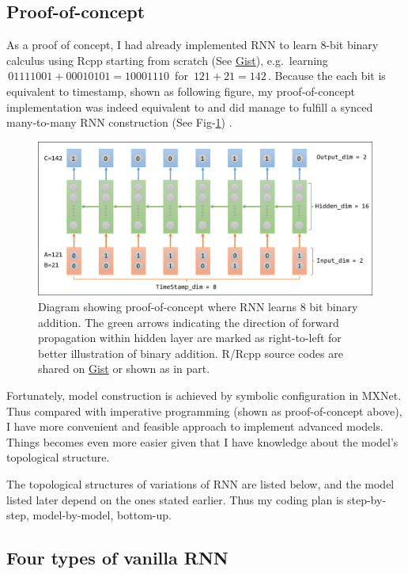 \documentclass[]{article}
\begin{document}
\subsection{Proof-of-concept}\label{proof-of-concept}

As a proof of concept, I had already implemented RNN to learn 8-bit
binary calculus using Rcpp starting from scratch (See
\href{https://gist.github.com/Puriney/072a37ea8a181f0b6168}{Gist}),
e.g.~learning \(\,01111001 + 00010101 = 10001110\,\) for
\(\,121+21=142\,\). Because the each bit is equivalent to timestamp,
shown as following figure, my proof-of-concept implementation was indeed
equivalent to and did manage to fulfill a synced many-to-many RNN
construction (See Fig-\ref{fig:proof-of-concept}) .

\begin{figure}[ht]
\centering
\includegraphics[width=0.8\linewidth]{binary-addition.png}
\caption{Diagram showing proof-of-concept where RNN learns 8 bit binary addition. The green arrows indicating the direction of forward propagation within hidden layer are marked as right-to-left for better illustration of binary addition. R/Rcpp source codes are shared on \href{https://gist.github.com/Puriney/072a37ea8a181f0b6168}{Gist} or shown as in  part.}
\label{fig:proof-of-concept}
\end{figure}


Fortunately, model construction is achieved by symbolic configuration in
MXNet. Thus compared with imperative programming (shown as
proof-of-concept above), I have more convenient and feasible approach to
implement advanced models. Things becomes even more easier given that I
have knowledge about the model's topological structure.

The topological structures of variations of RNN are listed below, and
the model listed later depend on the ones stated earlier. Thus my coding
plan is step-by-step, model-by-model, bottom-up.

\subsection{Four types of vanilla RNN}\label{four-types-of-vanilla-rnn}
\end{document}
